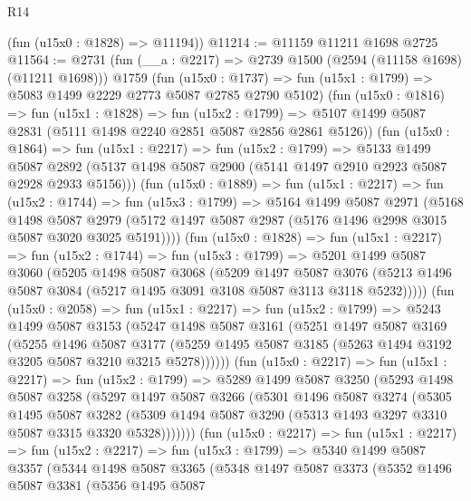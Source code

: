 \begin{lexlean}{R14}
\begin{coremodule}
      (fun (u15x0 : @1828) => @11194))
@11214 := @11159 @11211 @1698 @2725
@11564 := @2731
    (fun (__a : @2217) => @2739 @1500 (@2594 (@11158 @1698) (@11211 @1698)))
    @1759
    (fun (u15x0 : @1737) => fun (u15x1 : @1799) => @5083 @1499 @2229 @2773 @5087 @2785 @2790 @5102)
    (fun (u15x0 : @1816) =>
    fun (u15x1 : @1828) =>
    fun (u15x2 : @1799) =>
    @5107 @1499 @5087 @2831 (@5111 @1498 @2240 @2851 @5087 @2856 @2861 @5126))
    (fun (u15x0 : @1864) =>
    fun (u15x1 : @2217) =>
    fun (u15x2 : @1799) =>
    @5133
      @1499
      @5087
      @2892
      (@5137 @1498 @5087 @2900 (@5141 @1497 @2910 @2923 @5087 @2928 @2933 @5156)))
    (fun (u15x0 : @1889) =>
    fun (u15x1 : @2217) =>
    fun (u15x2 : @1744) =>
    fun (u15x3 : @1799) =>
    @5164
      @1499
      @5087
      @2971
      (@5168
        @1498
        @5087
        @2979
        (@5172 @1497 @5087 @2987 (@5176 @1496 @2998 @3015 @5087 @3020 @3025 @5191))))
    (fun (u15x0 : @1828) =>
    fun (u15x1 : @2217) =>
    fun (u15x2 : @1744) =>
    fun (u15x3 : @1799) =>
    @5201
      @1499
      @5087
      @3060
      (@5205
        @1498
        @5087
        @3068
        (@5209
          @1497
          @5087
          @3076
          (@5213 @1496 @5087 @3084 (@5217 @1495 @3091 @3108 @5087 @3113 @3118 @5232)))))
    (fun (u15x0 : @2058) =>
    fun (u15x1 : @2217) =>
    fun (u15x2 : @1799) =>
    @5243
      @1499
      @5087
      @3153
      (@5247
        @1498
        @5087
        @3161
        (@5251
          @1497
          @5087
          @3169
          (@5255
            @1496
            @5087
            @3177
            (@5259 @1495 @5087 @3185 (@5263 @1494 @3192 @3205 @5087 @3210 @3215 @5278))))))
    (fun (u15x0 : @2217) =>
    fun (u15x1 : @2217) =>
    fun (u15x2 : @1799) =>
    @5289
      @1499
      @5087
      @3250
      (@5293
        @1498
        @5087
        @3258
        (@5297
          @1497
          @5087
          @3266
          (@5301
            @1496
            @5087
            @3274
            (@5305
              @1495
              @5087
              @3282
              (@5309 @1494 @5087 @3290 (@5313 @1493 @3297 @3310 @5087 @3315 @3320 @5328)))))))
    (fun (u15x0 : @2217) =>
    fun (u15x1 : @2217) =>
    fun (u15x2 : @2217) =>
    fun (u15x3 : @1799) =>
    @5340
      @1499
      @5087
      @3357
      (@5344
        @1498
        @5087
        @3365
        (@5348
          @1497
          @5087
          @3373
          (@5352
            @1496
            @5087
            @3381
            (@5356
              @1495
              @5087

\end{coremodule}
\end{lexlean}
